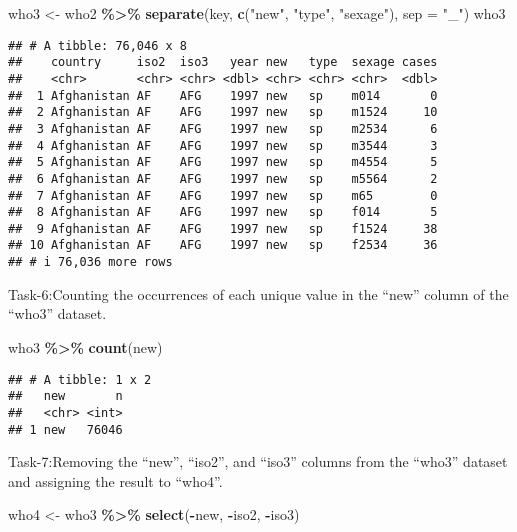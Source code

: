 \documentclass[
]{article}
\newenvironment{Shaded}{\begin{snugshade}}{\end{snugshade}}
\newcommand{\AttributeTok}[1]{\textcolor[rgb]{0.13,0.29,0.53}{#1}}
\newcommand{\FunctionTok}[1]{\textcolor[rgb]{0.13,0.29,0.53}{\textbf{#1}}}
\newcommand{\NormalTok}[1]{#1}
\newcommand{\OtherTok}[1]{\textcolor[rgb]{0.56,0.35,0.01}{#1}}
\newcommand{\SpecialCharTok}[1]{\textcolor[rgb]{0.81,0.36,0.00}{\textbf{#1}}}
\newcommand{\StringTok}[1]{\textcolor[rgb]{0.31,0.60,0.02}{#1}}
\begin{document}
\begin{Shaded}
\begin{Highlighting}[]
\NormalTok{who3 }\OtherTok{\textless{}{-}}\NormalTok{ who2 }\SpecialCharTok{\%\textgreater{}\%} 
  \FunctionTok{separate}\NormalTok{(key, }\FunctionTok{c}\NormalTok{(}\StringTok{"new"}\NormalTok{, }\StringTok{"type"}\NormalTok{, }\StringTok{"sexage"}\NormalTok{), }\AttributeTok{sep =} \StringTok{"\_"}\NormalTok{)}
\NormalTok{who3}
\end{Highlighting}
\end{Shaded}

\begin{verbatim}
## # A tibble: 76,046 x 8
##    country     iso2  iso3   year new   type  sexage cases
##    <chr>       <chr> <chr> <dbl> <chr> <chr> <chr>  <dbl>
##  1 Afghanistan AF    AFG    1997 new   sp    m014       0
##  2 Afghanistan AF    AFG    1997 new   sp    m1524     10
##  3 Afghanistan AF    AFG    1997 new   sp    m2534      6
##  4 Afghanistan AF    AFG    1997 new   sp    m3544      3
##  5 Afghanistan AF    AFG    1997 new   sp    m4554      5
##  6 Afghanistan AF    AFG    1997 new   sp    m5564      2
##  7 Afghanistan AF    AFG    1997 new   sp    m65        0
##  8 Afghanistan AF    AFG    1997 new   sp    f014       5
##  9 Afghanistan AF    AFG    1997 new   sp    f1524     38
## 10 Afghanistan AF    AFG    1997 new   sp    f2534     36
## # i 76,036 more rows
\end{verbatim}

Task-6:Counting the occurrences of each unique value in the ``new''
column of the ``who3'' dataset.

\begin{Shaded}
\begin{Highlighting}[]
\NormalTok{who3 }\SpecialCharTok{\%\textgreater{}\%} 
  \FunctionTok{count}\NormalTok{(new)}
\end{Highlighting}
\end{Shaded}

\begin{verbatim}
## # A tibble: 1 x 2
##   new       n
##   <chr> <int>
## 1 new   76046
\end{verbatim}

Task-7:Removing the ``new'', ``iso2'', and ``iso3'' columns from the
``who3'' dataset and assigning the result to ``who4''.

\begin{Shaded}
\begin{Highlighting}[]
\NormalTok{who4 }\OtherTok{\textless{}{-}}\NormalTok{ who3 }\SpecialCharTok{\%\textgreater{}\%} 
  \FunctionTok{select}\NormalTok{(}\SpecialCharTok{{-}}\NormalTok{new, }\SpecialCharTok{{-}}\NormalTok{iso2, }\SpecialCharTok{{-}}\NormalTok{iso3)}
\end{Highlighting}
\end{Shaded}
\end{document}
